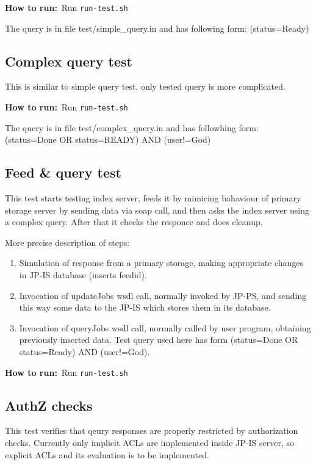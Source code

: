 \documentclass{egee}
\def\how{\noindent\textbf{How to run:}}
\begin{document}
\begin{enumerate}
\how\ Run \texttt{run-test.sh}

\begin{hints} 
The query is in file test/simple\_query.in and has following
  form: (status=Ready)
\end{hints}

\subsection{Complex query test}
This is similar to simple query test, only tested query is more complicated.

\how\ Run \texttt{run-test.sh}

\begin{hints}
The query is in file test/complex\_query.in and has followhing
  form: (status=Done OR status=READY) AND (user!=God)
\end{hints}

\subsection{Feed \& query test}
This test starts testing index server, feeds it by
mimicing bahaviour of primary storage server by sending data
via soap call, and then asks the index server using a complex
query. After that it checks the responce and does cleanup.

More precise description of steps:
\begin{enumerate}
 \item Simulation of response from a primary storage, making appropriate
   changes in JP-IS database (inserts feedid).
 \item Invocation of updateJobs wsdl call, normally invoked by JP-PS, and
   sending this way some data to the JP-IS which stores them in its database.
 \item Invocation of queryJobs wsdl call, normally called by user
   program, obtaining previously inserted data. Test query used here has form
   (status=Done OR status=Ready) AND (user!=God).
\end{enumerate}

\how\ Run \texttt{run-test.sh}

\subsection{AuthZ checks}
This test verifies that qeury responses are properly restricted by
authorization checks. Currently only implicit ACLs are implemented
inside JP-IS server, so explicit ACLs and its evaluation is to be implemented.


\end{enumerate}
\end{document}
